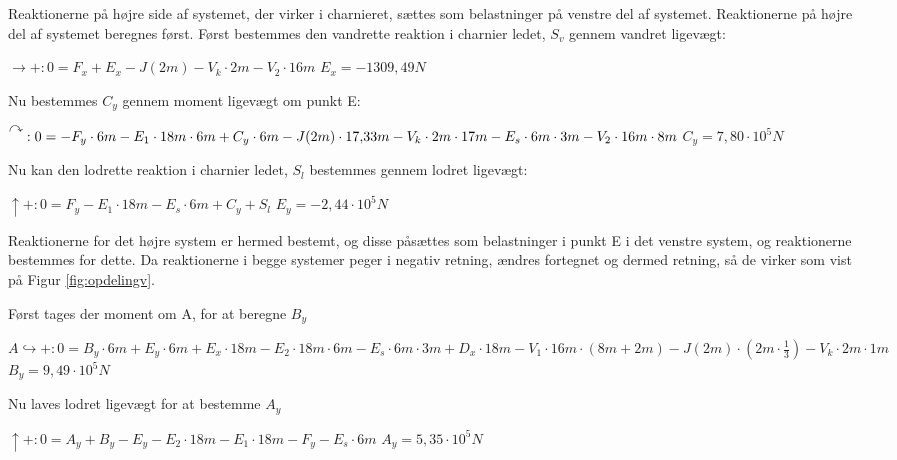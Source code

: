 Reaktionerne på højre side af systemet, der virker i charnieret, sættes som belastninger på venstre del af systemet. Reaktionerne på højre del af systemet beregnes først.
\newline
\newline
Først bestemmes den vandrette reaktion i charnier ledet, $S_v$ gennem vandret ligevægt: 
\begin{center}
	$\rightarrow+:0 = F_x + E_x - J(2m) - V_k \cdot 2m - V_2 \cdot 16m$
	\newline
	$E_x = -1309,\!49 N$
\end{center}

Nu bestemmes $C_y$ gennem moment ligevægt om punkt E: 
\begin{center}
	$\AR{}:0 = -F_y \cdot 6m - E_1 \cdot 18m \cdot 6m + C_y \cdot 6m - J(2m) \cdot 17,\!33m - V_k \cdot 2m \cdot 17m - E_s \cdot 6m \cdot 3m - V_2 \cdot 16m \cdot 8m$
	\newline
	$C_y = 7,\!80 \cdot 10^5 N$
\end{center}

Nu kan den lodrette reaktion i charnier ledet, $S_l$ bestemmes gennem lodret ligevægt: 
\begin{center}
	$\uparrow+: 0 = F_y - E_1 \cdot 18m - E_s \cdot 6m + C_y + S_l$
	\newline	
	$E_y = -2,\!44 \cdot 10^5N$
\end{center}

Reaktionerne for det højre system er hermed bestemt, og disse påsættes som belastninger i punkt E i det venstre system, og reaktionerne bestemmes for dette. Da reaktionerne i begge systemer peger i negativ retning, ændres fortegnet og dermed retning, så de virker som vist på Figur \ref{fig:opdelingv}.

Først tages der moment om A, for at beregne $B_y$  
\begin{center}
	$A\hookrightarrow+: 0 = B_y \cdot 6m + E_y \cdot 6m + E_x \cdot 18m - E_2 \cdot 18m \cdot 6m - E_s \cdot 6m \cdot 3m + D_x \cdot 18m - V_1 \cdot 16m \cdot (8m + 2m) - J(2m) \cdot (2m \cdot \frac{1}{3}) - V_k \cdot 2m \cdot 1m$
	\newline 
	$B_y = 9,\!49 \cdot 10^5N$
\end{center}

Nu laves lodret ligevægt for at bestemme $A_y$
\begin{center}
	$\uparrow+: 0 = A_y + B_y - E_y - E_2 \cdot 18m - E_1 \cdot 18m - F_y - E_s \cdot 6 m$
	\newline
	$A_y = 5,\!35 \cdot 10^5N$
\end{center}


